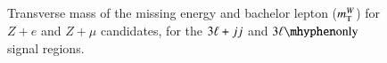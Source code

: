 \begin{appendices}
\begin{figure}[htb]
{  }
  \caption{Transverse mass of the missing energy and bachelor lepton ($m_{\mathrm{T}}^W$) for $Z+e$ and $Z+\mu$ candidates, for the $3\ell+jj$ and $\threelo$ signal regions.}
  \label{fig:SR-mTW-2}
\end{figure}

\clearpage


\end{appendices}
